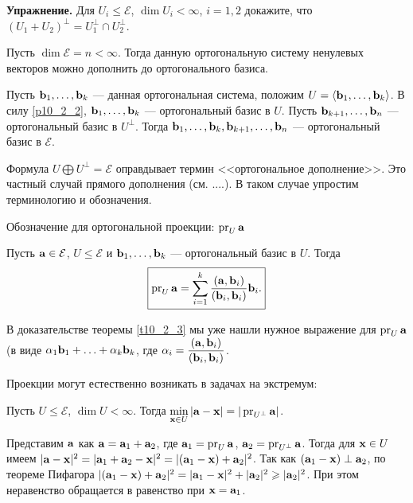 {\bf Упражнение.}
Для $U_i\leq \mathcal{E}$, $\dim U_i<\infty$, $i=1, 2$ докажите, что $(U_1+U_2)^{\bot} = U_1^{\bot} \cap U_2^{\bot}$.


\begin{sled3}
Пусть  $\dim \mathcal{E}=n< \infty$. Тогда данную ортогональную систему ненулевых векторов можно дополнить до ортогонального базиса.
\end{sled3}
\dok Пусть  $\mathbf{b}_1, \ldots, \mathbf{b}_k$ --- данная ортогональная система, положим $U = \langle \mathbf{b}_1, \ldots, \mathbf{b}_k \rangle$.
В силу \ref{p10_2_2}, $\mathbf{b}_1, \ldots, \mathbf{b}_k$ ---  ортогональный базис в $U$. Пусть 
$\mathbf{b}_{k+1}, \ldots, \mathbf{b}_n$ ---  ортогональный базис в $U^{\bot}$. 
Тогда $\mathbf{b}_1, \ldots, \mathbf{b}_k, \mathbf{b}_{k+1},\ldots, \mathbf{b}_n$ ---  ортогональный базис в $\mathcal{E}$.
\edok



Формула $U\bigoplus U^{\bot}=\mathcal{E}$  оправдывает термин <<ортогональное дополнение>>. Это частный случай прямого дополнения (см. ....).
В таком случае упростим терминологию и обозначения.


Обозначение для ортогональной проекции: $\mathop{\rm pr}\nolimits_U \mathbf{a}$

\begin{predl}\label{10_2_4} 
Пусть $\mathbf{a}\in \mathcal{E}$, $U\leq \mathcal{E}$ 
и $\mathbf{b}_1, \ldots, \mathbf{b}_k$ --- ортогональный базис в $U$. Тогда 
$$\boxed{\mathop{\rm pr}\nolimits_U \mathbf{a} = \sum\limits_{i=1}^k \frac{(\mathbf{a}, \mathbf{b}_i)}{(\mathbf{b}_i, \mathbf{b}_i)} \mathbf{b}_i.}$$
\end{predl}
\dok 
В доказательстве теоремы \ref{t10_2_3} мы уже нашли нужное выражение для $\mathop{\rm pr}\nolimits_U \mathbf{a}$ 
(в виде $\alpha_1\mathbf{b}_1+\ldots + \alpha_k\mathbf{b}_k$, где $\alpha_i = \dfrac{(\mathbf{a}, \mathbf{b}_i)}{(\mathbf{b}_i, \mathbf{b}_i)}$.
\edok



\otstup

Проекции могут естественно возникать в задачах на экстремум:

\begin{predl}\label{10_2_5} 
Пусть $U\leq \mathcal{E}$, $\dim U<\infty$. 
Тогда $\min\limits_{\mathbf{x}\in U} |\mathbf{a}-\mathbf{x}| = |\mathop{\rm pr}\nolimits_{U^{\bot}} \mathbf{a}|$.
\end{predl}
\dok Представим $\mathbf{a}$ как $\mathbf{a}=\mathbf{a}_1+\mathbf{a}_2$, где $\mathbf{a}_1 = \mathop{\rm pr}\nolimits_U \mathbf{a}$, $\mathbf{a}_2 = \mathop{\rm pr}\nolimits_{U^{\bot}} \mathbf{a}$.
Тогда для $\mathbf{x}\in U$ имеем $|\mathbf{a}-\mathbf{x}|^2 = |\mathbf{a}_1+\mathbf{a}_2-\mathbf{x}|^2 = |(\mathbf{a}_1-\mathbf{x})+\mathbf{a}_2|^2 $.
Так как $(\mathbf{a}_1-\mathbf{x}) \perp \mathbf{a}_2$, по теореме Пифагора 
$|(\mathbf{a}_1-\mathbf{x})+\mathbf{a}_2|^2 = |\mathbf{a}_1-\mathbf{x}|^2+|\mathbf{a}_2|^2\geqslant |\mathbf{a}_2|^2$.
При этом неравенство обращается в равенство при $\mathbf{x}=\mathbf{a}_1$.
\edok

